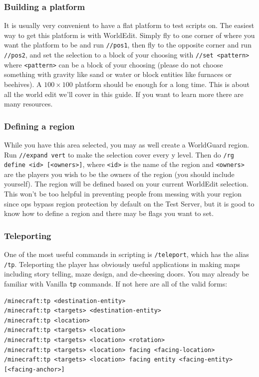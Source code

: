 \documentclass[oneside]{book}
\begin{document}
\subsubsection*{Building a platform}

It is usually very convenient to have a flat platform to test scripts on. The easiest way to get this platform is with WorldEdit. Simply fly to one corner of where you want the platform to be and run \texttt{//pos1}, then fly to the opposite corner and run \texttt{//pos2}, and set the selection to a block of your choosing with \texttt{//set <pattern>} where \texttt{<pattern>} can be a block of your choosing (please do not choose something with gravity like sand or water or block entities like furnaces or beehives). A $100 \times 100$ platform should be enough for a long time. This is about all the world edit we'll cover in this guide. If you want to learn more there are many resources. %

\subsubsection*{Defining a region} \label{sec:defrg}

While you have this area selected, you may as well create a WorldGuard region. Run \texttt{//expand vert} to make the selection cover every y level. Then do \texttt{/rg define <id> [<owners>]}, where \texttt{<id>} is the name of the region and \texttt{<owners>} are the players you wish to be the owners of the region (you should include yourself). The region will be defined based on your current WorldEdit selection. This won't be too helpful in preventing people from messing with your region since ops bypass region protection by default on the Test Server, but it is good to know how to define a region and there may be flags you want to set.

\subsubsection*{Teleporting}

One of the most useful commands in scripting is \texttt{/teleport}, which has the alias \texttt{/tp}. Teleporting the player has obviously useful applications in making maps including story telling, maze design, and de-cheesing doors. You may already be familiar with Vanilla \texttt{tp} commands. If not here are all of the valid forms:

\begin{verbatim}
/minecraft:tp <destination-entity>
/minecraft:tp <targets> <destination-entity>
/minecraft:tp <location>
/minecraft:tp <targets> <location>
/minecraft:tp <targets> <location> <rotation>
/minecraft:tp <targets> <location> facing <facing-location>
/minecraft:tp <targets> <location> facing entity <facing-entity>
[<facing-anchor>]
\end{verbatim}
\end{document}
